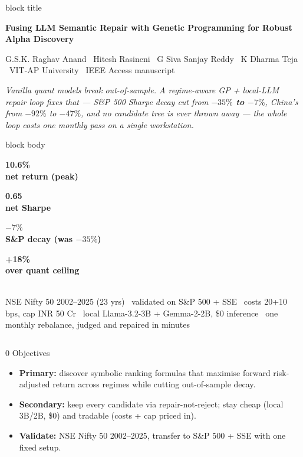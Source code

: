 \documentclass[final]{beamer}
\newcommand{\hl}[1]{\textbf{\textcolor{navy2}{#1}}}
\newcommand{\kpi}[3]{%
  \begin{minipage}[t]{0.235\linewidth}\centering
    {\color{#3}\fontsize{30}{30}\selectfont\bfseries #1}\\[0.08cm]
    {\small\bfseries #2}%
  \end{minipage}%
}
\begin{document}
\begin{frame}[t]
\begin{beamercolorbox}[wd=\textwidth,leftskip=1.2cm,rightskip=1.2cm,sep=0.55cm]{block title}
\centering
{\fontsize{44}{46}\selectfont\bfseries Fusing LLM Semantic Repair with Genetic Programming for Robust Alpha Discovery\par}
\vspace{0.25cm}
{\Large G.S.K. Raghav Anand \textbullet\ Hitesh Rasineni \textbullet\ G Siva Sanjay Reddy \textbullet\ K Dharma Teja \textbullet\ VIT-AP University \textbullet\ IEEE Access manuscript\par}
\vspace{0.2cm}
{\large\itshape Vanilla quant models break out-of-sample. A regime-aware GP + local-LLM repair loop fixes that --- S\&P 500 Sharpe decay cut from \textbf{$-35\%$ to $-7\%$}, China's from $-92\%$ to $-47\%$, and no candidate tree is ever thrown away --- the whole loop costs one monthly pass on a single workstation.}
\end{beamercolorbox}
\vskip0.3cm
\begin{beamercolorbox}[wd=\textwidth,leftskip=0.8cm,rightskip=0.8cm,sep=0.35cm]{block body}
\centering
\kpi{10.6\%}{net return (peak)}{good}\hfill
\kpi{0.65}{net Sharpe}{navy2}\hfill
\kpi{$-7\%$}{S\&P decay (was $-35\%$)}{good}\hfill
\kpi{+18\%}{over quant ceiling}{accent2}\\[0.1cm]
{\small NSE Nifty 50 2002--2025 (23 yrs) \textbullet\ validated on S\&P 500 + SSE \textbullet\ costs 20+10 bps, cap INR 50 Cr \textbullet\ local Llama-3.2-3B + Gemma-2-2B, \$0 inference \textbullet\ one monthly rebalance, judged and repaired in minutes}
\end{beamercolorbox}
\vskip0.2cm
\begin{columns}[t,onlytextwidth]
\begin{block}{0 Objectives}
\begin{itemize}
  \item \hl{Primary:} discover symbolic ranking formulas that maximise forward risk-adjusted return across regimes while cutting out-of-sample decay.
  \item \hl{Secondary:} keep every candidate via repair-not-reject; stay cheap (local 3B/2B, \$0) and tradable (costs + cap priced in).
  \item \hl{Validate:} NSE Nifty 50 2002--2025, transfer to S\&P 500 + SSE with one fixed setup.
\end{itemize}
\end{block}

\end{columns}
\end{frame}
\end{document}
